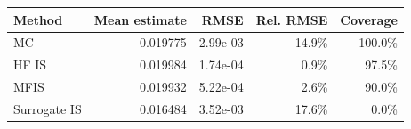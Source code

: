 \begin{tabular}{lrrrr}
\toprule
Method & Mean estimate & RMSE & Rel. RMSE & Coverage \\
\midrule
MC & 0.019775 & 2.99e-03 & 14.9\% & 100.0\% \\
HF IS & 0.019984 & 1.74e-04 & 0.9\% & 97.5\% \\
MFIS & 0.019932 & 5.22e-04 & 2.6\% & 90.0\% \\
Surrogate IS & 0.016484 & 3.52e-03 & 17.6\% & 0.0\% \\
\bottomrule
\end{tabular}